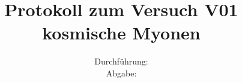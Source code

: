 \titlehead{\texttt{[image: resources/logo.jpg]}}
\title{Protokoll zum Versuch  V01\\ kosmische Myonen }
\date{Durchführung:  \\ Abgabe:  }

